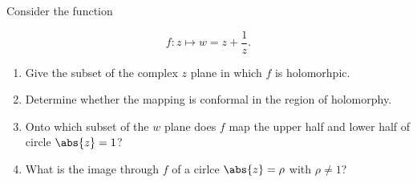 \documentclass[english,a4paper,12pt]{report}
\begin{document}
{Consider the function 

\begin{equation}
    f: z  \mapsto w = z+\frac{1}{z} .
\end{equation}

\begin{enumerate}
    \item Give the subset of the complex \(z\)  plane in which \(f\) is holomorhpic.
    \item Determine whether the mapping is conformal in the region of holomorphy.
    \item  Onto which subset of the \(w\) plane does \(f\) map the upper half and lower half of circle \(\abs{z} = 1 \)?
    \item What is the image through \(f\) of a cirlce \(\abs{z} = \rho \) with \(\rho \neq 1\)?  
\end{enumerate}
~
}
\end{document}
